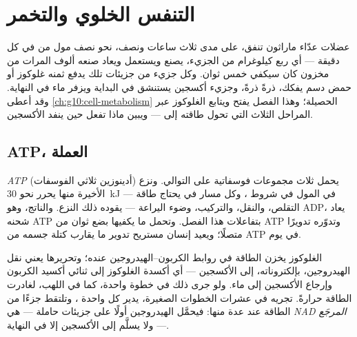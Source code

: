 \chapter{التنفس الخلوي والتخمر}\label{ch:g12:respiration-fermentation}

عضلات عدّاء ماراثون تنفق، على مدى ثلاث ساعات ونصف، نحو نصف مول من 
في كل دقيقة --- أي ربع كيلوغرام من الجزيء، يصنع ويستعمل ويعاد صنعه
ألوف المرات من مخزون كان سيكفي خمس ثوان. وكل جزيء من جزيئات  تلك
يدفع ثمنه غلوكوز أو حمض دسم يفكك، ذرةً ذرةً، وجزيء أكسجين يستنشق في
البداية ويزفر ماء في النهاية. وقد أعطى \cref{ch:g10:cell-metabolism}
الحصيلة؛ وهذا الفصل يفتح  ويتابع الغلوكوز عبر المراحل الثلاث
التي تحول طاقته إلى  --- ويبين ماذا تفعل  حين ينفد الأكسجين.

\section{ATP، العملة}

\begin{definition}[ATP]\label{def:g12:respiration-fermentation:atp}
\emph{ATP} (أدينوزين ثلاثي الفوسفات)  يحمل ثلاث
مجموعات فوسفاتية على التوالي. ونزع الأخيرة منها يحرر نحو \qty{30}{kJ}
في المول في شروط ، وكل مسار في  يحتاج طاقة --- التقلص،
والنقل، والتركيب، وضوء اليراعة --- يقوده ذلك النزع. والناتج، وهو ADP،
يعاد شحنه ATP بتفاعلات هذا الفصل. وتحمل  ما يكفيها بضع ثوان من
ATP وتدوّره تدويرًا متصلًا؛ ويعيد إنسان مستريح تدوير ما يقارب كتلة جسمه
من ATP في يوم.
\end{definition}

\begin{proposition}\label{prop:g12:respiration-fermentation:oxidation}
الغلوكوز يخزن الطاقة في روابط الكربون--الهيدروجين عنده؛ وتحريرها يعني
نقل الهيدروجين، بإلكتروناته، إلى الأكسجين --- أي أكسدة الغلوكوز إلى
ثنائي أكسيد الكربون وإرجاع الأكسجين إلى ماء. ولو جرى ذلك في خطوة
واحدة، كما في اللهب، لغادرت الطاقة حرارةً.  تجريه في عشرات
الخطوات الصغيرة، يدير كل واحدة ، وتلتقط جزءًا من الطاقة عند عدة
منها: فيحمَّل الهيدروجين أولًا على جزيئات حاملة --- هي \emph{NAD
المرجَع} --- ولا يسلَّم إلى الأكسجين إلا في النهاية.
\end{proposition}
\admitted

